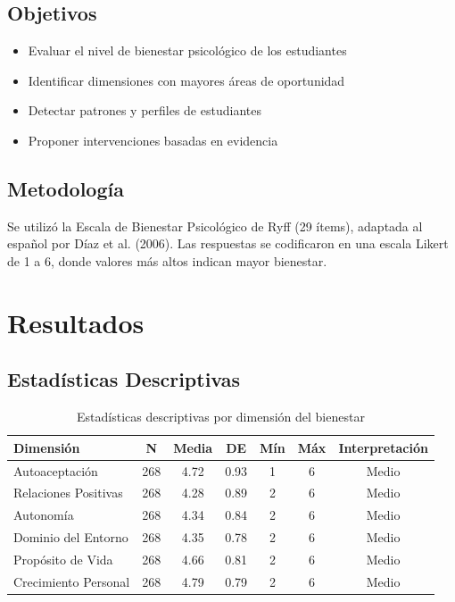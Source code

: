 \documentclass[12pt,a4paper]{article}
\begin{document}
\subsection{Objetivos}
\begin{itemize}
    \item Evaluar el nivel de bienestar psicológico de los estudiantes
    \item Identificar dimensiones con mayores áreas de oportunidad
    \item Detectar patrones y perfiles de estudiantes
    \item Proponer intervenciones basadas en evidencia
\end{itemize}

\subsection{Metodología}
Se utilizó la Escala de Bienestar Psicológico de Ryff (29 ítems), adaptada al español 
por Díaz et al. (2006). Las respuestas se codificaron en una escala Likert de 1 a 6, 
donde valores más altos indican mayor bienestar.

\section{Resultados}

\subsection{Estadísticas Descriptivas}

\begin{table}[H]
\centering
\caption{Estadísticas descriptivas por dimensión del bienestar}
\label{tab:descriptivas}
\begin{tabular}{@{}lcccccc@{}}
\toprule
\textbf{Dimensión} & \textbf{N} & \textbf{Media} & \textbf{DE} & \textbf{Mín} & \textbf{Máx} & \textbf{Interpretación} \\
\midrule
Autoaceptación & 268 & 4.72 & 0.93 & 1 & 6 & \textcolor{siyellow}{Medio} \\
Relaciones Positivas & 268 & 4.28 & 0.89 & 2 & 6 & \textcolor{siyellow}{Medio} \\
Autonomía & 268 & 4.34 & 0.84 & 2 & 6 & \textcolor{siyellow}{Medio} \\
Dominio del Entorno & 268 & 4.35 & 0.78 & 2 & 6 & \textcolor{siyellow}{Medio} \\
Propósito de Vida & 268 & 4.66 & 0.81 & 2 & 6 & \textcolor{siyellow}{Medio} \\
Crecimiento Personal & 268 & 4.79 & 0.79 & 2 & 6 & \textcolor{siyellow}{Medio} \\

\bottomrule
\end{tabular}
\end{table}
\end{document}
